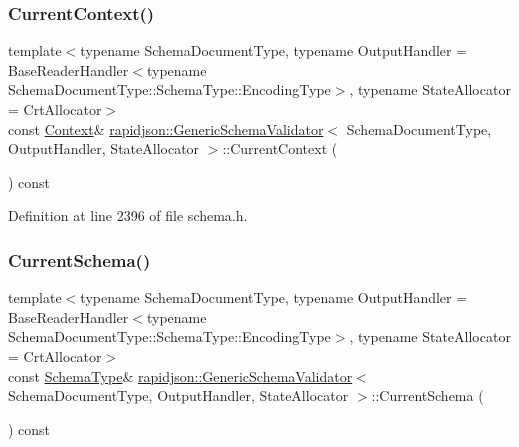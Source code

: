 \subsubsection{\texorpdfstring{CurrentContext()}{CurrentContext()}\hspace{0.1cm}{\footnotesize\ttfamily [2/2]}}
{\footnotesize\ttfamily template$<$typename Schema\+Document\+Type, typename Output\+Handler = Base\+Reader\+Handler$<$typename Schema\+Document\+Type\+::\+Schema\+Type\+::\+Encoding\+Type$>$, typename State\+Allocator = Crt\+Allocator$>$ \\
const \mbox{\hyperlink{classrapidjson_1_1_generic_schema_validator_ae76e4602ce2ef7070a57f0df5bb07e76}{Context}}\& \mbox{\hyperlink{classrapidjson_1_1_generic_schema_validator}{rapidjson\+::\+Generic\+Schema\+Validator}}$<$ Schema\+Document\+Type, Output\+Handler, State\+Allocator $>$\+::Current\+Context (\begin{DoxyParamCaption}{ }\end{DoxyParamCaption}) const\hspace{0.3cm}{\ttfamily [private]}}



Definition at line 2396 of file schema.\+h.


\begin{DoxyCode}{0}

\end{DoxyCode}
\mbox{\label{classrapidjson_1_1_generic_schema_validator_a4407789d931a65b7d49affd71808ace3}} 
\subsubsection{\texorpdfstring{CurrentSchema()}{CurrentSchema()}}
{\footnotesize\ttfamily template$<$typename Schema\+Document\+Type, typename Output\+Handler = Base\+Reader\+Handler$<$typename Schema\+Document\+Type\+::\+Schema\+Type\+::\+Encoding\+Type$>$, typename State\+Allocator = Crt\+Allocator$>$ \\
const \mbox{\hyperlink{classrapidjson_1_1_generic_schema_validator_a0619c9faf3014ef141d1c6d05ae04ddc}{Schema\+Type}}\& \mbox{\hyperlink{classrapidjson_1_1_generic_schema_validator}{rapidjson\+::\+Generic\+Schema\+Validator}}$<$ Schema\+Document\+Type, Output\+Handler, State\+Allocator $>$\+::Current\+Schema (\begin{DoxyParamCaption}{ }\end{DoxyParamCaption}) const\hspace{0.3cm}{\ttfamily [private]}}




